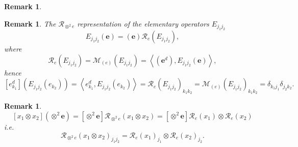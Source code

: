 \documentclass[aps,preprint]{revtex4}%
\newtheorem{remark}[theorem]{Remark}
\begin{document}
\begin{remark}
\begin{enumerate}
\end{enumerate}
\end{remark}

\begin{remark}
The $\mathcal{R}_{\otimes^{2}e}$ representation of the elementary operators
$E_{j_{1}j_{2}}$
\begin{equation}
E_{j_{1}j_{2}}\left(  \mathbf{e}\right)  =\left(  \mathbf{e}\right)
\mathcal{R}_{e}\left(  E_{j_{1}j_{2}}\right)  ,
\end{equation}
where
\begin{equation}
\mathcal{R}_{e}\left(  E_{j_{1}j_{2}}\right)  =\mathcal{M}_{\left(  e\right)
}\left(  E_{j_{1}j_{2}}\right)  =\left\langle \left(  \mathbf{e}^{d}\right)
,E_{j_{1}j_{2}}\left(  \mathbf{e}\right)  \right\rangle ,
\end{equation}
hence
\begin{equation}
\left[  e_{k_{1}}^{d}\right]  \left(  E_{j_{1}j_{2}}\left(  e_{k_{2}}\right)
\right)  =\left\langle e_{k_{1}}^{d},E_{j_{1}j_{2}}\left(  e_{k_{2}}\right)
\right\rangle =\mathcal{R}_{e}\left(  E_{j_{1}j_{2}}\right)  _{k_{1}k_{2}%
}=\mathcal{M}_{\left(  e\right)  }\left(  E_{j_{1}j_{2}}\right)  _{k_{1}k_{2}%
}=\delta_{k_{1}j_{1}}\delta_{j_{2}k_{2}}.
\end{equation}

\end{remark}

\begin{remark}%
\begin{equation}
\left[  x_{1}\otimes x_{2}\right]  \left(  \otimes^{2}\mathbf{e}\right)
=\left[  \otimes^{2}\mathbf{e}\right]  \mathcal{R}_{\otimes^{2}e}\left(
x_{1}\otimes x_{2}\right)  =\left[  \otimes^{2}\mathbf{e}\right]
\mathcal{R}_{e}\left(  x_{1}\right)  \otimes\mathcal{R}_{e}\left(
x_{2}\right)
\end{equation}
i.e.
\begin{equation}
\mathcal{R}_{\otimes^{2}e}\left(  x_{1}\otimes x_{2}\right)  _{j_{1}j_{2}%
}=\mathcal{R}_{e}\left(  x_{1}\right)  _{j_{1}}\otimes\mathcal{R}_{e}\left(
x_{2}\right)  _{j_{2}}.
\end{equation}

\end{remark}
\end{document}
